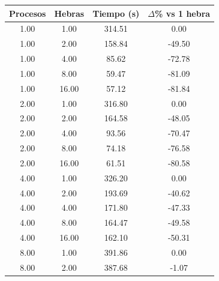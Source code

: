 \begin{table}[ht]
    \centering
    \begin{tabular}{|c|c|c|c|}
        \hline
        \textbf{Procesos} & \textbf{Hebras} & \textbf{Tiempo (s)} & \textbf{$\Delta$\% vs 1 hebra} \\
        \hline
        1.00              & 1.00            & 314.51              & 0.00                           \\
        1.00              & 2.00            & 158.84              & -49.50                         \\
        1.00              & 4.00            & 85.62               & -72.78                         \\
        1.00              & 8.00            & 59.47               & -81.09                         \\
        1.00              & 16.00           & 57.12               & -81.84                         \\
        2.00              & 1.00            & 316.80              & 0.00                           \\
        2.00              & 2.00            & 164.58              & -48.05                         \\
        2.00              & 4.00            & 93.56               & -70.47                         \\
        2.00              & 8.00            & 74.18               & -76.58                         \\
        2.00              & 16.00           & 61.51               & -80.58                         \\
        4.00              & 1.00            & 326.20              & 0.00                           \\
        4.00              & 2.00            & 193.69              & -40.62                         \\
        4.00              & 4.00            & 171.80              & -47.33                         \\
        4.00              & 8.00            & 164.47              & -49.58                         \\
        4.00              & 16.00           & 162.10              & -50.31                         \\
        8.00              & 1.00            & 391.86              & 0.00                           \\
        8.00              & 2.00            & 387.68              & -1.07                          \\

\end{tabular}
\end{table}
